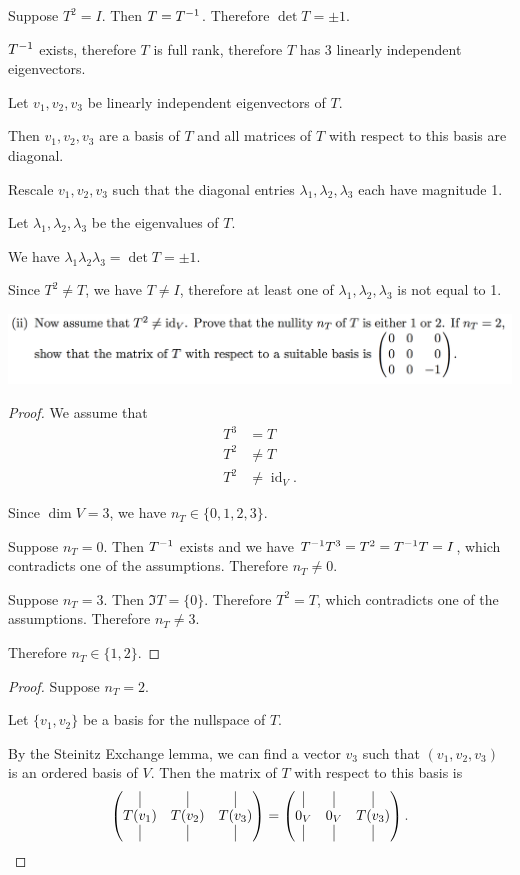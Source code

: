 \documentclass[12pt]{article}
\DeclareMathOperator{\id}{\mathrm{id}}
\begin{document}
Suppose $T^2 = I$. Then $T = T^{-1}$. Therefore $\det T = \pm 1$.

$T^{-1}$ exists, therefore $T$ is full rank, therefore $T$ has 3 linearly
independent eigenvectors.

Let $v_1, v_2, v_3$ be linearly independent eigenvectors of $T$.

Then $v_1, v_2, v_3$ are a basis of $T$ and all matrices of $T$ with respect to
this basis are diagonal.

Rescale $v_1, v_2, v_3$ such that the diagonal entries
$\lambda_1, \lambda_2, \lambda_3$ each have magnitude 1.


Let $\lambda_1, \lambda_2, \lambda_3$ be the eigenvalues of $T$.

We have $\lambda_1\lambda_2\lambda_3 = \det T = \pm 1$.

Since $T^2 \neq T$, we have $T \neq I$, therefore at least one of
$\lambda_1, \lambda_2, \lambda_3$ is not equal to 1.


\newpage
\begin{mdframed}
\includegraphics[width=400pt]{img/oxford-prelims-2017-A-4-3.png}
\end{mdframed}


\begin{proof}
  We assume that
  \begin{align*}
    T^3 &= T\\
    T^2 &\neq T\\
    T^2 &\neq \id_V.
  \end{align*}

  Since $\dim V = 3$, we have $n_T \in \{0, 1, 2, 3\}$.

  Suppose $n_T = 0$. Then $T^{-1}$ exists and we have
  $T^{-1}T^3 = T^2 = T^{-1}T = I$, which contradicts one of the
  assumptions. Therefore $n_T \neq 0$.

  Suppose $n_T = 3$. Then $\Im T = \{0\}$. Therefore $T^2 = T$, which
  contradicts one of the assumptions. Therefore $n_T \neq 3$.

  Therefore $n_T \in \{1, 2\}$.
\end{proof}

\begin{proof}
  Suppose $n_T = 2$.

  Let $\{v_1, v_2\}$ be a basis for the nullspace of $T$.

  By the Steinitz Exchange lemma, we can find a vector $v_3$ such that
  $(v_1, v_2, v_3)$ is an ordered basis of $V$. Then the matrix of $T$ with
  respect to this basis is
  \begin{align*}
    \matMMMxNNN{\vline}{\vline}{\vline}
               {T(v_1)}{T(v_2)}{T(v_3)}
               {\vline}{\vline}{\vline} =
    \matMMMxNNN{\vline}{\vline}{\vline}
               {0_V}{0_V}{T(v_3)}
               {\vline}{\vline}{\vline}.
  \end{align*}


\end{proof}
\end{document}
